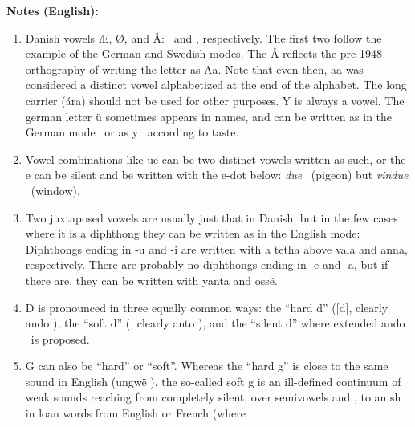 \documentclass[a4paper]{article}
\begin{document}

\pagebreak
{\Large \textbf{Notes (English):}\par}

\begin{enumerate}
\item Danish vowels Æ, Ø, and Å: \Ttelco\TTinvertedthreedots\Ts
  \Ttelco\TTdoubleacute ~and \Taara\TTthreedots, respectively.  The
  first two follow the example of the German and Swedish modes.  The Å
  reflects the pre-1948 orthography of writing the letter as Aa.  Note
  that even then, aa was considered a distinct vowel alphabetized at
  the end of the alphabet.  The long carrier (\'ara) should not be
  used for other purposes.  Y is always a vowel.  The german letter
  \"u sometimes appears in names, and can be written as in the German
  mode \Ttelco\TTtwodots ~or as y \Ttelco\TTbreve ~according to
  taste.\label{notevokal}
\item Vowel combinations like ue can be two distinct vowels written as
  such, or the e can be silent and be written with the e-dot below: \emph{due}
  \Tando\Ttelco\TTleftcurl\Ttelco\TTacute ~(pigeon) but
  \emph{vindue}
  \Tampa\Tando\TTnasalizer\TTdot\Ttelco\TTleftcurl\TTdotbelow
  ~(window). 
\item Two juxtaposed vowels are usually just that in Danish, but in
  the few cases where it is a diphthong they can be 
  written as in the English mode: Diphthongs ending in -u and -i are written
  with a tetha above vala and anna, respectively.  There are probably
  no diphthongs ending in -e and -a, but if there are, they can be
  written with yanta and oss\"e.\label{noteDif}
\item D is pronounced in three equally common ways: the ``hard d''
  ([d], clearly ando \Tando), the ``soft d'' (\textipa{[D]}, clearly anto \Tanto), and the
  ``silent d'' where extended ando
  \Textendedando ~is proposed.\label{noteD}
\item G can also be ``hard'' or ``soft''.  Whereas the ``hard g'' is
  close to the same sound in English (ungw\"e \Tungwe), the so-called
  soft g is an ill-defined continuum of weak sounds reaching from
  completely silent, over semivowels \textipa{[I]} and \textipa{[U]},
  to an sh \textipa{[S]} in loan words from English or French (where

\end{enumerate}
\end{document}
